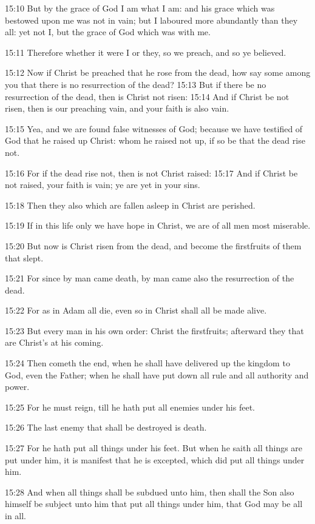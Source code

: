 15:10 But by the grace of God I am what I am: and his grace which was bestowed upon me was not in vain; but I laboured more abundantly than they all: yet not I, but the grace of God which was with me.

15:11 Therefore whether it were I or they, so we preach, and so ye believed.

15:12 Now if Christ be preached that he rose from the dead, how say some among you that there is no resurrection of the dead?  15:13 But if there be no resurrection of the dead, then is Christ not risen: 15:14 And if Christ be not risen, then is our preaching vain, and your faith is also vain.

15:15 Yea, and we are found false witnesses of God; because we have testified of God that he raised up Christ: whom he raised not up, if so be that the dead rise not.

15:16 For if the dead rise not, then is not Christ raised: 15:17 And if Christ be not raised, your faith is vain; ye are yet in your sins.

15:18 Then they also which are fallen asleep in Christ are perished.

15:19 If in this life only we have hope in Christ, we are of all men most miserable.

15:20 But now is Christ risen from the dead, and become the firstfruits of them that slept.

15:21 For since by man came death, by man came also the resurrection of the dead.

15:22 For as in Adam all die, even so in Christ shall all be made alive.

15:23 But every man in his own order: Christ the firstfruits; afterward they that are Christ's at his coming.

15:24 Then cometh the end, when he shall have delivered up the kingdom to God, even the Father; when he shall have put down all rule and all authority and power.

15:25 For he must reign, till he hath put all enemies under his feet.

15:26 The last enemy that shall be destroyed is death.

15:27 For he hath put all things under his feet. But when he saith all things are put under him, it is manifest that he is excepted, which did put all things under him.

15:28 And when all things shall be subdued unto him, then shall the Son also himself be subject unto him that put all things under him, that God may be all in all.

